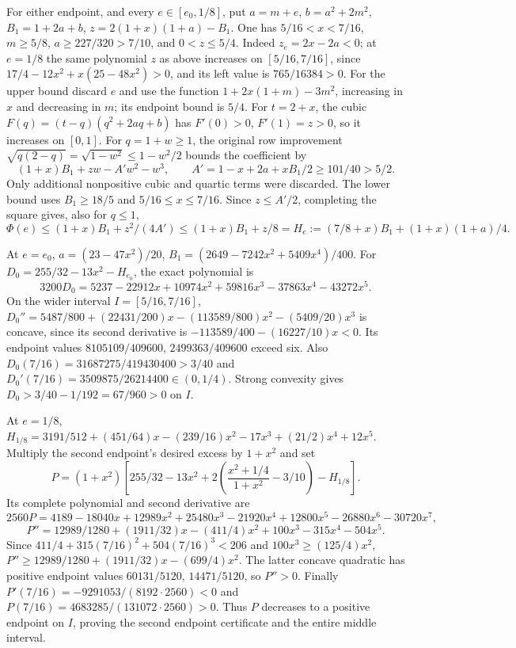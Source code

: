 For either endpoint, and every $e\in[e_0,1/8]$, put
$a=m+e$, $b=a^2+2m^2$, $B_1=1+2a+b$,
$z=2(1+x)(1+a)-B_1$. One has $5/16<x<7/16$,
$m\ge5/8$, $a\ge227/320>7/10$, and $0<z\le5/4$.
Indeed $z_e=2x-2a<0$; at $e=1/8$ the same polynomial $z$ as above
increases on $[5/16,7/16]$, since
$17/4-12x^2+x(25-48x^2)>0$, and its left value is $765/16384>0$.
For the upper bound discard $e$ and use the function
$1+2x(1+m)-3m^2$, increasing in $x$ and decreasing in $m$;
its endpoint bound is $5/4$.
For $t=2+x$, the cubic $F(q)=(t-q)(q^2+2aq+b)$ has
$F'(0)>0$, $F'(1)=z>0$, so it increases on $[0,1]$.
For $q=1+w\ge1$, the original row improvement
$\sqrt{q(2-q)}=\sqrt{1-w^2}\le1-w^2/2$ bounds the coefficient by
\[
(1+x)B_1+zw-A'w^2-w^3,
\qquad A'=1-x+2a+xB_1/2\ge101/40>5/2.
\]
Only additional nonpositive cubic and quartic terms were discarded.
The lower bound uses $B_1\ge18/5$ and $5/16\le x\le7/16$.
Since $z\le A'/2$, completing the square gives, also for $q\le1$,
\begin{equation}\tag{L29.II.4}\label{eq:L29:He}
\Phi(e)\le(1+x)B_1+z^2/(4A')\le(1+x)B_1+z/8
=H_e:=(7/8+x)B_1+(1+x)(1+a)/4.
\end{equation}

At $e=e_0$, $a=(23-47x^2)/20$,
$B_1=(2649-7242x^2+5409x^4)/400$.
For $D_0=255/32-13x^2-H_{e_0}$, the exact polynomial is
\[
3200D_0=5237-22912x+10974x^2+59816x^3-37863x^4-43272x^5.
\]
On the wider interval $I=[5/16,7/16]$,
$D_0''=5487/800+(22431/200)x-(113589/800)x^2-(5409/20)x^3$
is concave, since its second derivative is
$-113589/400-(16227/10)x<0$.
Its endpoint values $8105109/409600$, $2499363/409600$ exceed six.
Also $D_0(7/16)=31687275/419430400>3/40$ and
$D_0'(7/16)=3509875/26214400\in(0,1/4)$.
Strong convexity gives $D_0>3/40-1/192=67/960>0$ on $I$.

At $e=1/8$,
$H_{1/8}=3191/512+(451/64)x-(239/16)x^2-17x^3+(21/2)x^4+12x^5$.
Multiply the second endpoint's desired excess by $1+x^2$ and set
\[
P=(1+x^2)\left[255/32-13x^2
+2\left(\frac{x^2+1/4}{1+x^2}-3/10\right)-H_{1/8}\right].
\]
Its complete polynomial and second derivative are
\[
2560P=4189-18040x+12989x^2+25480x^3-21920x^4
+12800x^5-26880x^6-30720x^7,
\]
\[
P''=12989/1280+(1911/32)x-(411/4)x^2+100x^3-315x^4-504x^5.
\]
Since $411/4+315(7/16)^2+504(7/16)^3<206$ and
$100x^3\ge(125/4)x^2$,
$P''\ge12989/1280+(1911/32)x-(699/4)x^2$.
The latter concave quadratic has positive endpoint values
$60131/5120$, $14471/5120$, so $P''>0$.
Finally $P'(7/16)=-9291053/(8192\cdot2560)<0$ and
$P(7/16)=4683285/(131072\cdot2560)>0$.
Thus $P$ decreases to a positive endpoint on $I$, proving the second
endpoint certificate and the entire middle interval.

